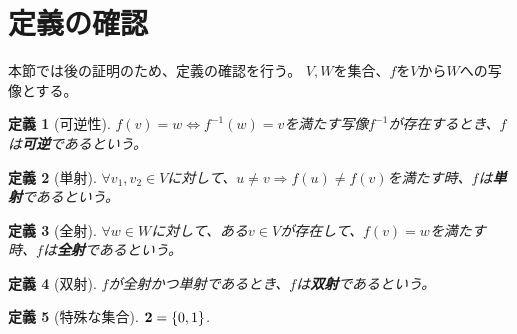 \documentclass{jsarticle}
\newtheorem{Definition}{定義}
\begin{document}
\section{定義の確認}
本節では後の証明のため、定義の確認を行う。
$V,W$を集合、$f$を$V$から$W$への写像とする。
\begin{Definition}[可逆性]
    $f(v)=w \Leftrightarrow f^{-1}(w)=v$を満たす写像$f^{-1}$が存在するとき、$f$は{\bf 可逆}であるという。
\end{Definition}

\begin{Definition}[単射]
    $\forall v_1,v_2 \in V$に対して、$u \neq v \Rightarrow f(u) \neq f(v)$を満たす時、$f$は{\bf 単射}であるという。
\end{Definition}

\begin{Definition}[全射]
    $\forall w \in W$に対して、ある$v \in V$が存在して、$f(v)=w$を満たす時、$f$は{\bf 全射}であるという。
\end{Definition}

\begin{Definition}[双射]
    $f$が全射かつ単射であるとき、$f$は{\bf 双射}であるという。
\end{Definition}

\begin{Definition}[特殊な集合]
    ${\bf 2} = \{0,1\}$.
\end{Definition}
\end{document}
